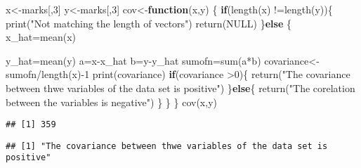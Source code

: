 \documentclass[
]{article}
\newenvironment{Shaded}{\begin{snugshade}}{\end{snugshade}}
\newcommand{\ConstantTok}[1]{\textcolor[rgb]{0.00,0.00,0.00}{#1}}
\newcommand{\ControlFlowTok}[1]{\textcolor[rgb]{0.13,0.29,0.53}{\textbf{#1}}}
\newcommand{\DecValTok}[1]{\textcolor[rgb]{0.00,0.00,0.81}{#1}}
\newcommand{\FunctionTok}[1]{\textcolor[rgb]{0.00,0.00,0.00}{#1}}
\newcommand{\NormalTok}[1]{#1}
\newcommand{\OtherTok}[1]{\textcolor[rgb]{0.56,0.35,0.01}{#1}}
\newcommand{\SpecialCharTok}[1]{\textcolor[rgb]{0.00,0.00,0.00}{#1}}
\newcommand{\StringTok}[1]{\textcolor[rgb]{0.31,0.60,0.02}{#1}}
\begin{document}
\begin{Shaded}
\begin{Highlighting}[]
\NormalTok{x}\OtherTok{\textless{}{-}}\NormalTok{marks[,}\DecValTok{3}\NormalTok{]}
\NormalTok{y}\OtherTok{\textless{}{-}}\NormalTok{marks[,}\DecValTok{3}\NormalTok{]}
\NormalTok{cov}\OtherTok{\textless{}{-}}\ControlFlowTok{function}\NormalTok{(x,y) \{}
  \ControlFlowTok{if}\NormalTok{(}\FunctionTok{length}\NormalTok{(x) }\SpecialCharTok{!=}\FunctionTok{length}\NormalTok{(y))\{}
    \FunctionTok{print}\NormalTok{(}\StringTok{"Not matching the length of vectors"}\NormalTok{)}
    \FunctionTok{return}\NormalTok{(}\ConstantTok{NULL}\NormalTok{)}
\NormalTok{  \}}\ControlFlowTok{else}\NormalTok{ \{}
\NormalTok{    x\_hat}\OtherTok{=}\FunctionTok{mean}\NormalTok{(x)}
    
\NormalTok{    y\_hat}\OtherTok{=}\FunctionTok{mean}\NormalTok{(y)}
\NormalTok{    a}\OtherTok{=}\NormalTok{x}\SpecialCharTok{{-}}\NormalTok{x\_hat}
\NormalTok{    b}\OtherTok{=}\NormalTok{y}\SpecialCharTok{{-}}\NormalTok{y\_hat}
\NormalTok{    sumofn}\OtherTok{=}\FunctionTok{sum}\NormalTok{(a}\SpecialCharTok{*}\NormalTok{b)}
\NormalTok{    covariance}\OtherTok{\textless{}{-}}\NormalTok{sumofn}\SpecialCharTok{/}\FunctionTok{length}\NormalTok{(x)}\SpecialCharTok{{-}}\DecValTok{1}
    \FunctionTok{print}\NormalTok{(covariance)}
    \ControlFlowTok{if}\NormalTok{(covariance }\SpecialCharTok{\textgreater{}}\DecValTok{0}\NormalTok{)\{}
      \FunctionTok{return}\NormalTok{(}\StringTok{"The covariance between thwe variables of the data set is positive"}\NormalTok{)}
\NormalTok{    \}}\ControlFlowTok{else}\NormalTok{\{}
      \FunctionTok{return}\NormalTok{(}\StringTok{"The corelation between the variables is negative"}\NormalTok{)}
\NormalTok{    \}}
\NormalTok{  \}}
\NormalTok{\}}
\FunctionTok{cov}\NormalTok{(x,y)}
\end{Highlighting}
\end{Shaded}

\begin{verbatim}
## [1] 359
\end{verbatim}

\begin{verbatim}
## [1] "The covariance between thwe variables of the data set is positive"
\end{verbatim}
\end{document}

